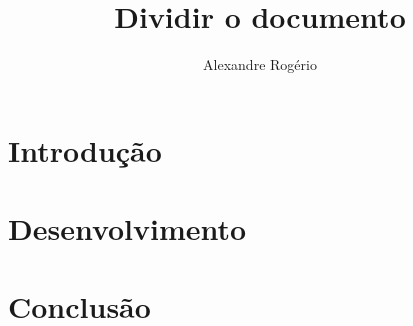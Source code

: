\documentclass{article}
\begin{document}
	\title{\textbf{{\Huge Dividir o documento}}}
	\author{Alexandre Rogério}
	\maketitle
	\thispagestyle{empty}
	\newpage
	
	\setcounter{page}{1}
	\tableofcontents
	\newpage
	
	\listoffigures
	\newpage
	
	\listoftables
	\newpage
	
	\setcounter{page}{1}
	
	\section{Introdução}
		
	\section{Desenvolvimento}
		
	\section{Conclusão}
		
\end{document}
